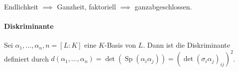 \documentclass{article}
\begin{document}
Endlichkeit $\implies$ Ganzheit, 
faktoriell $\implies$ ganzabgeschlossen.

\paragraph{Diskriminante}
Sei $\alpha_1, \dots, \alpha_n, n = [L:K]$ eine $K$-Basis von $L$. Dann ist die Diskriminante definiert durch $d(\alpha_1, \dots, \alpha_n) = \operatorname{det}(\operatorname{Sp}(\alpha_i\alpha_j)) = (\operatorname{det}(\sigma_i\alpha_j)_{ij})^2$.
\end{document}
